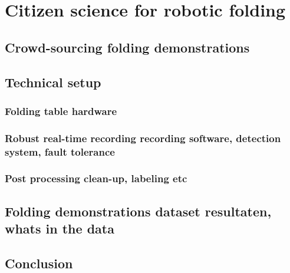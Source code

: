 \documentclass[\home/main.tex]{subfiles}
\begin{document}
\chapter{Citizen science for robotic folding}\label{ch:data_collection}

\section{Crowd-sourcing folding demonstrations}
\section{Technical setup}
\subsection{Folding table {\tiny hardware}}
\subsection{Robust real-time recording {\tiny recording software, detection system, fault tolerance}}
\subsection{Post processing {\tiny clean-up, labeling etc}}
\section{Folding demonstrations dataset {\tiny resultaten, whats in the data}}
\section{Conclusion}
\end{document}
